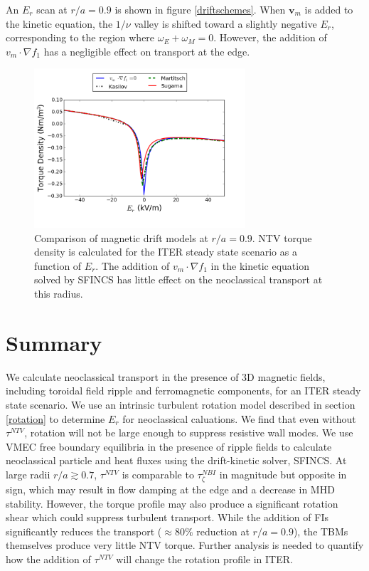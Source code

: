 \documentclass{article}
\begin{document}
An $E_r$ scan at $r/a = 0.9$ is shown in figure \ref{driftschemes}. When $\bm{v}_m$ is added to the kinetic equation, the $1/\nu$ valley is shifted toward a slightly negative $E_r$, corresponding to the region where $\omega_E + \omega_M = 0$. However, the addition of $v_m \cdot \nabla f_1$ has a negligible effect on transport at the edge. 

\begin{figure}[h!]
\centering
\includegraphics[width=0.7\textwidth]{mdscomparison.png}
\caption{Comparison of magnetic drift models at $r/a = 0.9$. NTV torque density is calculated for the ITER steady state scenario as a function of $E_r$. The addition of $v_m \cdot \nabla f_1$ in the kinetic equation solved by SFINCS has little effect on the neoclassical transport at this radius. }
\end{figure}\label{driftschemes}

\FloatBarrier

\section{Summary}\label{summary}

We calculate neoclassical transport in the presence of 3D magnetic fields, including toroidal field ripple and ferromagnetic components, for an ITER steady state scenario. We use an intrinsic turbulent rotation model described in section \ref{rotation} to determine $E_r$ for neoclassical caluations. We find that even without $\tau^{NTV}$, rotation will not be large enough to suppress resistive wall modes. We use VMEC free boundary equilibria in the presence of ripple fields to calculate neoclassical particle and heat fluxes using the drift-kinetic solver, SFINCS. At large radii $r/a \gtrsim 0.7$, $\tau^{NTV}$ is comparable to $\tau^{NBI}_{\zeta}$ in magnitude but opposite in sign, which may result in flow damping at the edge and a decrease in MHD stability. However, the torque profile may also produce a significant rotation shear which could suppress turbulent transport. While the addition of FIs significantly reduces the transport ($\approx 80\%$ reduction at $r/a = 0.9$), the TBMs themselves produce very little NTV torque. Further analysis is needed to quantify how the addition of $\tau^{NTV}$ will change the rotation profile in ITER. 
\end{document}
